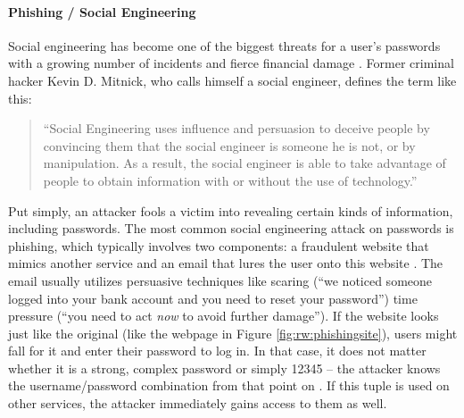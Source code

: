 \paragraph{Phishing / Social Engineering} 
Social engineering has become one of the biggest threats for a user's passwords with a growing number of incidents and fierce financial damage \cite{BKA2016Bundeslagebild}. Former criminal hacker Kevin D. Mitnick, who calls himself a social engineer, defines the term like this:
\begin{quotation}
	``Social Engineering uses influence and persuasion to deceive people
	by convincing them that the social engineer is someone he is not,
	or by manipulation. As a result, the social engineer is able to take
	advantage of people to obtain information with or without the use of
	technology.'' \cite[Frontmatter]{Mitnick2003ArtOfDeception}
\end{quotation}
Put simply, an attacker fools a victim into revealing certain kinds of information, including passwords. The most common social engineering attack on passwords is phishing, which typically involves two components: a fraudulent website that mimics another service and an email that lures the user onto this website \cite{Dhamija2006WhyPhishingWorks,Sheng2010WhoFallsForAPhish}. The email usually utilizes persuasive techniques like scaring  (``we noticed someone logged into your bank account and you need to reset your password'') time pressure (``you need to act \textit{now} to avoid further damage''). If the website looks just like the original (like the webpage in Figure \ref{fig:rw:phishingsite}), users might fall for it and enter their password to log in. In that case, it does not matter whether it is a strong, complex password or simply 12345 -- the attacker knows the username/password combination from that point on \cite{Tari2006ShoulderSurfingComparison}. If this tuple is used on other services, the attacker immediately gains access to them as well. 


